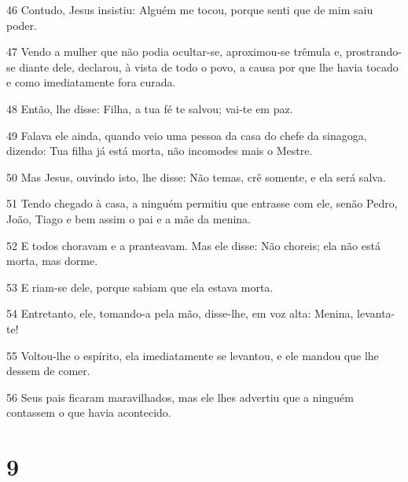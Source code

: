 \par 46 Contudo, Jesus insistiu: Alguém me tocou, porque senti que de mim saiu poder.
\par 47 Vendo a mulher que não podia ocultar-se, aproximou-se trêmula e, prostrando-se diante dele, declarou, à vista de todo o povo, a causa por que lhe havia tocado e como imediatamente fora curada.
\par 48 Então, lhe disse: Filha, a tua fé te salvou; vai-te em paz.
\par 49 Falava ele ainda, quando veio uma pessoa da casa do chefe da sinagoga, dizendo: Tua filha já está morta, não incomodes mais o Mestre.
\par 50 Mas Jesus, ouvindo isto, lhe disse: Não temas, crê somente, e ela será salva.
\par 51 Tendo chegado à casa, a ninguém permitiu que entrasse com ele, senão Pedro, João, Tiago e bem assim o pai e a mãe da menina.
\par 52 E todos choravam e a pranteavam. Mas ele disse: Não choreis; ela não está morta, mas dorme.
\par 53 E riam-se dele, porque sabiam que ela estava morta.
\par 54 Entretanto, ele, tomando-a pela mão, disse-lhe, em voz alta: Menina, levanta-te!
\par 55 Voltou-lhe o espírito, ela imediatamente se levantou, e ele mandou que lhe dessem de comer.
\par 56 Seus pais ficaram maravilhados, mas ele lhes advertiu que a ninguém contassem o que havia acontecido.

\chapter{9}

